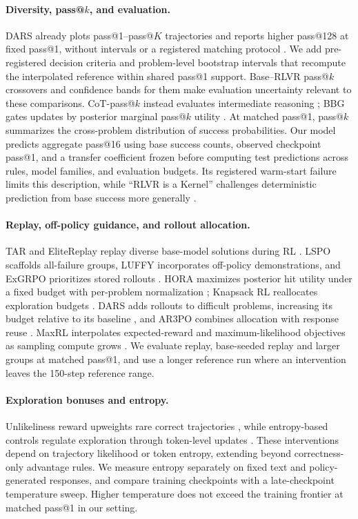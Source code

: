 \paragraph{Diversity, pass@$k$, and evaluation.}
DARS already plots pass@1--pass@$K$ trajectories and reports higher pass@128 at fixed pass@1, without intervals or a registered matching protocol \citep{yang2025depth}. We add pre-registered decision criteria and problem-level bootstrap intervals that recompute the interpolated reference within shared pass@1 support. Base--RLVR pass@$k$ crossovers \citep{yue2025limit} and confidence bands for them \citep{yang2026kernel} make evaluation uncertainty relevant to these comparisons. CoT-pass@$k$ instead evaluates intermediate reasoning \citep{wen2025cotpassk}; BBG gates updates by posterior marginal pass@$k$ utility \citep{yuan2026overtraining}. At matched pass@1, pass@$k$ summarizes the cross-problem distribution of success probabilities. Our model predicts aggregate pass@16 using base success counts, observed checkpoint pass@1, and a transfer coefficient frozen before computing test predictions across rules, model families, and evaluation budgets. Its registered warm-start failure limits this description, while ``RLVR is a Kernel'' challenges deterministic prediction from base success more generally \citep{yang2026kernel}.

\paragraph{Replay, off-policy guidance, and rollout allocation.}
TAR and EliteReplay replay diverse base-model solutions during RL \citep{li2026replay,moussa2026elitereplay}. LSPO scaffolds all-failure groups, LUFFY incorporates off-policy demonstrations, and ExGRPO prioritizes stored rollouts \citep{ding2026lspo,yan2025guidance,zhan2025exgrpo}. HORA maximizes posterior hit utility under a fixed budget with per-problem normalization \citep{wang2026hora}; Knapsack RL reallocates exploration budgets \citep{knapsack2025}. DARS adds rollouts to difficult problems, increasing its budget relative to its baseline \citep{yang2025depth}, and AR3PO combines allocation with response reuse \citep{zhang2025reuse}. MaxRL interpolates expected-reward and maximum-likelihood objectives as sampling compute grows \citep{tajwar2026maxrl}. We evaluate replay, base-seeded replay and larger groups at matched pass@1, and use a longer reference run where an intervention leaves the 150-step reference range.

\paragraph{Exploration bonuses and entropy.}
Unlikeliness reward upweights rare correct trajectories \citep{he2025unlikely}, while entropy-based controls regulate exploration through token-level updates \citep{cui2025entropy}. These interventions depend on trajectory likelihood or token entropy, extending beyond correctness-only advantage rules. We measure entropy separately on fixed text and policy-generated responses, and compare training checkpoints with a late-checkpoint temperature sweep. Higher temperature does not exceed the training frontier at matched pass@1 in our setting.
